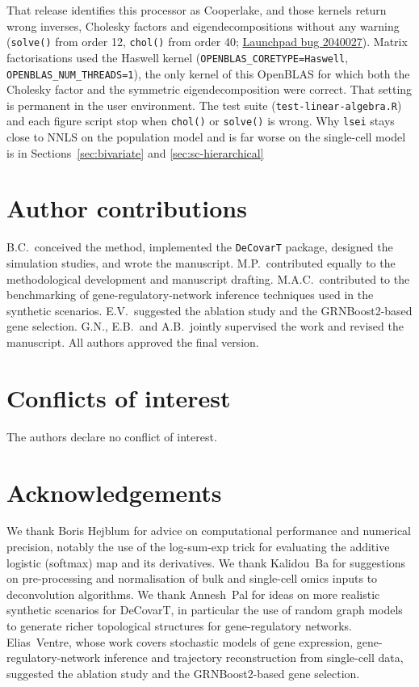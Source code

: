\documentclass[pdflatex, sn-nature]{sn-jnl}
\theoremstyle{thmstyleone}%
\theoremstyle{thmstyletwo}%
\theoremstyle{thmstylethree}%
\begin{document}
\begin{itemize}
        That release identifies this processor as Cooperlake, and those kernels return wrong inverses,
        Cholesky factors and eigendecompositions without any warning
        (\texttt{solve()} from order 12, \texttt{chol()} from order 40;
        \href{https://bugs.launchpad.net/ubuntu/+source/openblas/+bug/2040027}{Launchpad bug 2040027}).
        Matrix factorisations used the Haswell kernel
        (\texttt{OPENBLAS\_CORETYPE=Haswell}, \texttt{OPENBLAS\_NUM\_THREADS=1}), the only kernel of this
        OpenBLAS for which both the Cholesky factor and the symmetric eigendecomposition were correct.
        That setting is permanent in the user environment. The test suite
        (\texttt{test-linear-algebra.R}) and each figure script stop when \texttt{chol()} or
        \texttt{solve()} is wrong. Why \texttt{lsei} stays close to NNLS on the population model and is
        far worse on the single-cell model is in Sections~\ref{sec:bivariate} and
        \ref{sec:sc-hierarchical}
\end{itemize}

\section{Author contributions}

B.C.\ conceived the method, implemented the \texttt{DeCovarT} package, designed the simulation studies,
and wrote the manuscript. M.P.\ contributed equally to the methodological development and manuscript
drafting. M.A.C.\ contributed to the benchmarking of gene-regulatory-network inference techniques used in
the synthetic scenarios. E.V.\ suggested the ablation study and the GRNBoost2-based gene selection.
G.N., E.B.\ and A.B.\ jointly supervised the work and revised the manuscript. All
authors approved the final version.

\section{Conflicts of interest}

The authors declare no conflict of interest.

\section{Acknowledgements}

We thank Boris Hejblum for advice on computational performance and numerical precision, notably the use
of the log-sum-exp trick for evaluating the additive logistic (softmax) map and its derivatives. We thank
Kalidou~Ba for suggestions on pre-processing and normalisation of bulk and single-cell omics inputs to
deconvolution algorithms. We thank Annesh~Pal for ideas on more realistic synthetic scenarios for
DeCovarT, in particular the use of random graph models to generate richer topological structures for
gene-regulatory networks. Elias~Ventre, whose work covers stochastic models of gene expression,
gene-regulatory-network inference and trajectory reconstruction from single-cell data, suggested the
ablation study and the GRNBoost2-based gene selection.

\begin{appendices}

\end{appendices}


\end{document}
